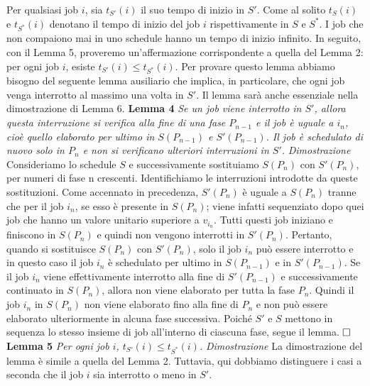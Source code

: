 \documentclass[twoside,openany,titlepage,fleqn,
	headinclude,12pt,a4paper,BCOR5mm,footinclude]{scrbook}
\begin{document}
Per qualsiasi job $i$, sia $t_{S'}(i)$ il suo tempo di inizio in $S'$. Come al solito $t_{S}(i)$ e $t_{S^{*}}(i)$ denotano il tempo di inizio del job $i$ rispettivamente in $S$ e $S^{*}$. I job che non compaiono mai in uno schedule hanno un tempo di inizio infinito. In seguito, con il Lemma 5, proveremo un'affermazione corrispondente a quella del Lemma 2: per ogni job $i$, esiste $t_{S'}(i) \leq  t_{S^{*}}(i)$. Per provare questo lemma abbiamo bisogno del seguente lemma ausiliario che implica, in particolare, che ogni job venga interrotto al massimo una volta in $S'$. Il lemma sarà anche essenziale nella dimostrazione di Lemma 6.
\newline\newline
\textbf{Lemma 4}
\textit{Se un job viene interrotto in $S'$, allora questa interruzione si verifica alla fine di una fase $P_{n-1}$ e il job è uguale a $i_{n}$, cioè quello elaborato per ultimo in $S(P_{n-1})$ e $S'(P_{n-1})$. Il job è schedulato di nuovo solo in $P_{n}$ e non si verificano ulteriori interruzioni in $S'$.}
\newline\newline
\textit{Dimostrazione}
Consideriamo lo schedule $S$ e successivamente sostituiamo $S(P_{n})$ con $S'(P_{n})$, per numeri di fase n crescenti. Identifichiamo le interruzioni introdotte da queste sostituzioni. Come accennato in precedenza, $S'(P_{n})$ è uguale a $S(P_{n})$ tranne che per il job $i_{n}$, se esso è presente in $S(P_{n})$; viene infatti sequenziato dopo quei job che hanno un valore unitario superiore a $v_{i_{n}}$. Tutti questi job iniziano e finiscono in $S(P_{n})$ e quindi non vengono interrotti in $S'(P_{n})$. Pertanto, quando si sostituisce $S(P_{n})$ con $S'(P_{n})$, solo il job $i_{n}$ può essere interrotto e in questo caso il job $i_{n}$ è schedulato per ultimo in $S(P_{n-1})$ e in $S'(P_{n-1})$. Se il job $i_{n}$ viene effettivamente interrotto alla fine di $S'(P_{n-1})$ e successivamente continuato in $S(P_{n})$, allora non viene elaborato per tutta la fase $P_{n}$. Quindi il job $i_{n}$ in $S(P_{n})$ non viene elaborato fino alla fine di $P_{n}$ e non può essere elaborato ulteriormente in alcuna fase successiva. Poiché $S'$ e $S$ mettono in sequenza lo stesso insieme di job all'interno di ciascuna fase, segue il lemma. $\hfill \square$
\newline \newline
\textbf{Lemma 5}
\textit{Per ogni job $i$, $t_{S'}(i) \leq t_{S^{*}}(i)$.}
\newline \newline
\textit{Dimostrazione}
La dimostrazione del lemma è simile a quella del Lemma 2. Tuttavia, qui dobbiamo distinguere i casi a seconda che il job $i$ sia interrotto o meno in $S'$. 
\end{document}
